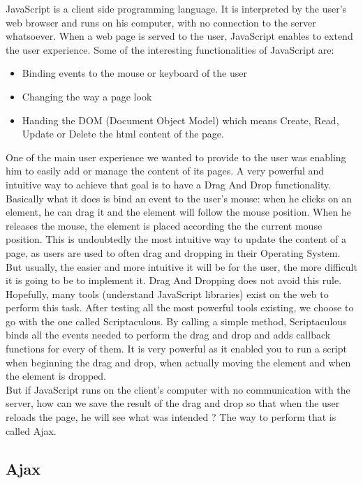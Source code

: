 JavaScript is a client side programming language. It is interpreted by the user's web browser and runs on his computer, with no connection to the server whatsoever. When a web page is served to the user, JavaScript enables to extend the user experience. Some of the interesting functionalities of JavaScript are:
\begin{itemize}
\item Binding events to the mouse or keyboard of the user
\item Changing the way a page look
\item Handing the DOM (Document Object Model) which means Create, Read, Update or Delete the html content of the page.
\end{itemize}
One of the main user experience we wanted to provide to the user was enabling him to easily add or manage the content of its pages. A very powerful and intuitive way to achieve that goal is to have a Drag And Drop functionality. Basically what it does is bind an event to the user's mouse: when he clicks on an element, he can drag it and the element will follow the mouse position. When he releases the mouse, the element is placed according the the current mouse position. This is undoubtedly the most intuitive way to update the content of a page, as users are used to often drag and dropping in their Operating System. 
\\But usually, the easier and more intuitive it will be for the user, the more difficult it is going to be to implement it. Drag And Dropping does not avoid this rule. Hopefully, many tools (understand JavaScript libraries) exist on the web to perform this task. After testing all the most powerful tools existing, we choose to go with the one called Scriptaculous. By calling a simple method, Scriptaculous binds all the events needed to perform the drag and drop and adds callback functions for every of them. It is very powerful as it enabled you to run a script when beginning the drag and drop, when actually moving the element and when the element is dropped. 
\\But if JavaScript runs on the client's computer with no communication with the server, how can we save the result of the drag and drop so that when the user reloads the page, he will see what was intended ? The way to perform that is called Ajax.

\subsection{Ajax}

